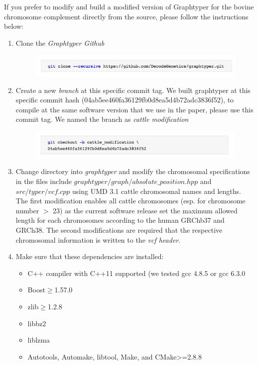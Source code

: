 \documentclass[../main.tex]{subfiles}
\begin{document}
\begin{flushleft}
If you prefer to modify and build a modified version of Graphtyper for the bovine chromosome
complement directly from the source, please follow the instructions below:

\begin{enumerate}
    \item Clone the \emph{Graphtyper Github}
    \begin{figure}[!htb]
        \centering
        \includegraphics[width=\textwidth]{paper1/supplement/sp13.png}
    \end{figure}

    \item Create a new \emph{branch} at this specific commit tag. We built graphtyper at this specific
    commit hash (04ab5ee460fa36129fb0d8ea5d4b72adc3836f52), to compile at the same
    software version that we use in the paper, please use this commit tag. We named the
    branch as \emph{cattle modification}

    \begin{figure}[!htb]
        \centering
        \includegraphics[width=\textwidth]{paper1/supplement/sp14.png}
    \end{figure}

    \item Change directory into \emph{graphtyper} and modify the chromosomal specifications in the files
    include $graphtyper/graph/absolute\_position.hpp$ and $src/typer/vcf.cpp$ using UMD 3.1 cattle
    chromosomal names and lengths. The first modification enables all cattle chromosomes
    (esp. for chromosome number $>$ 23) as the current software release set the maximum
    allowed length for each chromosomes according to the human GRChb37 and GRCh38. The
    second modifications are required that the respective chromosomal information is written
    to the \emph{vcf header}.

    \item Make sure that these dependencies are installed:
    \begin{itemize}
        \item C++ compiler with C++11 supported (we tested gcc 4.8.5 or gcc 6.3.0 
        \item Boost$\geq$1.57.0
        \item zlib$\geq$1.2.8
        \item libbz2
        \item liblzma
        \item Autotools, Automake, libtool, Make, and CMake>=2.8.8
    \end{itemize}
    

\end{enumerate}
\end{flushleft}
\end{document}
